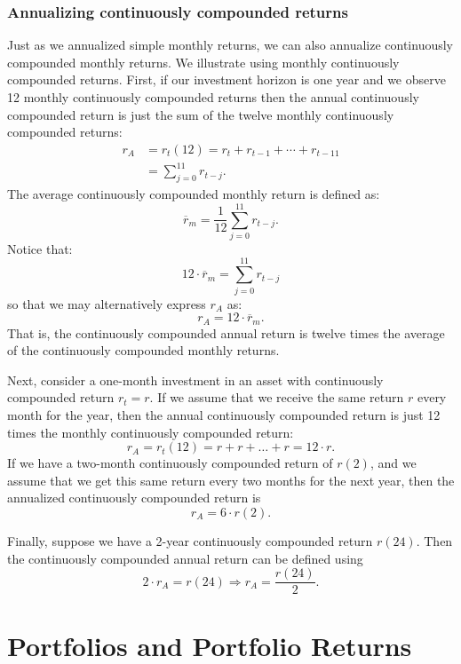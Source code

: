 \documentclass[
  letterpaper,
  DIV=11,
  numbers=noendperiod]{scrreprt}
\theoremstyle{definition}
\theoremstyle{definition}
\theoremstyle{remark}
\begin{document}
\hypertarget{annualizing-continuously-compounded-returns}{%
\subsubsection{Annualizing continuously compounded
returns}\label{annualizing-continuously-compounded-returns}}

Just as we annualized simple monthly returns, we can also annualize
continuously compounded monthly returns. We illustrate using monthly
continuously compounded returns. First, if our investment horizon is one
year and we observe 12 monthly continuously compounded returns then the
annual continuously compounded return is just the sum of the twelve
monthly continuously compounded returns: \begin{align*}
r_{A} & =r_{t}(12)=r_{t}+r_{t-1}+\cdots+r_{t-11}\\
 & =\sum_{j=0}^{11}r_{t-j}.
\end{align*} The average continuously compounded monthly return is
defined as: \[\overline{r}_{m}=\frac{1}{12}\sum_{j=0}^{11}r_{t-j}.\]
Notice that: \[12\cdot\overline{r}_{m}=\sum_{j=0}^{11}r_{t-j}\] so that
we may alternatively express \(r_{A}\) as:
\[r_{A}=12\cdot\overline{r}_{m}.\] That is, the continuously compounded
annual return is twelve times the average of the continuously compounded
monthly returns.

Next, consider a one-month investment in an asset with continuously
compounded return \(r_{t} = r\). If we assume that we receive the same
return \(r\) every month for the year, then the annual continuously
compounded return is just 12 times the monthly continuously compounded
return: \[r_{A}=r_{t}(12)=r + r + \ldots + r = 12\cdot r.\] If we have a
two-month continuously compounded return of \(r(2)\), and we assume that
we get this same return every two months for the next year, then the
annualized continuously compounded return is \[r_{A} = 6\cdot r(2).\]

Finally, suppose we have a 2-year continuously compounded return
\(r(24)\). Then the continuously compounded annual return can be defined
using \[2\cdot r_{A} = r(24) \Longrightarrow  r_{A} = \frac{r(24)}{2}.\]

\hypertarget{sec-portfolios-and-portfolio-returns}{%
\section{Portfolios and Portfolio
Returns}\label{sec-portfolios-and-portfolio-returns}}
\end{document}
